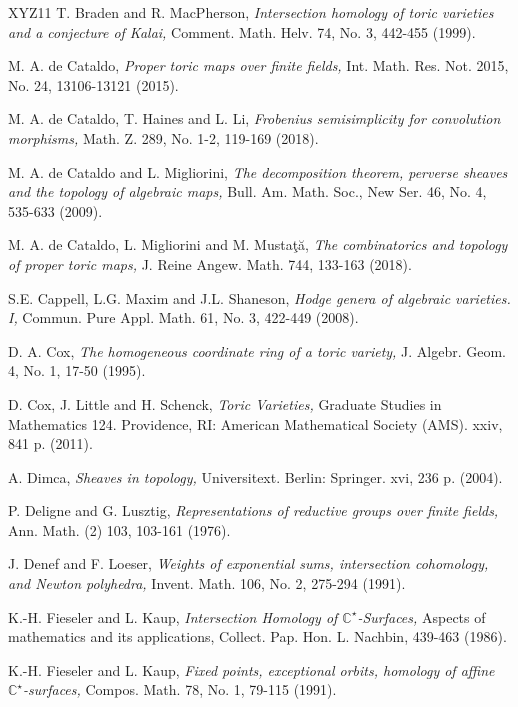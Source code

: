 \documentclass[11pt, reqno]{amsart}
\theoremstyle{plain}
\theoremstyle{definition}
\theoremstyle{remark}
\begin{document}
\begin{thebibliography}{XYZ11}
T. Braden and R. MacPherson, \emph{Intersection homology of toric varieties and a conjecture of Kalai,} Comment. Math. Helv.
74, No. 3, 442-455 (1999). 

M. A. de Cataldo, \emph{Proper toric maps over finite fields,}  Int. Math. Res. Not. 2015, No. 24, 13106-13121 (2015). 

M. A. de Cataldo, T. Haines and L. Li, \emph{Frobenius semisimplicity for convolution morphisms,}
Math. Z. 289, No. 1-2, 119-169 (2018). 


 M. A. de Cataldo and L. Migliorini, \emph{The decomposition theorem, perverse sheaves and the topology of algebraic maps,} Bull. Am. Math. Soc., New Ser. 46, No. 4, 535-633 (2009). 


 M. A. de Cataldo, L. Migliorini and M. Musta\c{t}\u{a}, \emph{The combinatorics and topology of proper toric maps,} J. Reine Angew. Math. 744, 133-163 (2018). 

S.E. Cappell, L.G. Maxim and J.L. Shaneson, \emph{Hodge genera of algebraic varieties. I,} Commun. Pure Appl. Math.
61, No. 3, 422-449 (2008). 



 D. A. Cox, \emph{The homogeneous coordinate ring of a toric variety,} J. Algebr. Geom. 4, No. 1, 17-50 (1995).

  D. Cox, J. Little and H. Schenck, \emph{Toric Varieties,} Graduate Studies in Mathematics 124. Providence, RI: American Mathematical Society (AMS). xxiv, 841 p. (2011). 


 A. Dimca,  \emph{Sheaves in topology,}  Universitext. Berlin: Springer. xvi, 236 p. (2004). 


P. Deligne and G. Lusztig, \emph{Representations of reductive groups over finite
fields,} Ann. Math. (2) 103, 103-161 (1976). 

 J. Denef and F. Loeser, \emph{Weights of exponential sums, intersection cohomology, and Newton polyhedra,} Invent. Math. 106, No. 2, 275-294 (1991).  


 K.-H. Fieseler and L. Kaup, \emph{Intersection Homology of $\mathbb{C}^{\star}$-Surfaces,} Aspects of mathematics and its applications, Collect. Pap. Hon. L. Nachbin, 439-463 (1986). 

K.-H. Fieseler and 	L. Kaup,  \emph{Fixed points, exceptional orbits, homology of affine $\mathbb{C}^{\star}$-surfaces,}
Compos. Math. 78, No. 1, 79-115 (1991). 


\end{thebibliography}
\end{document}
